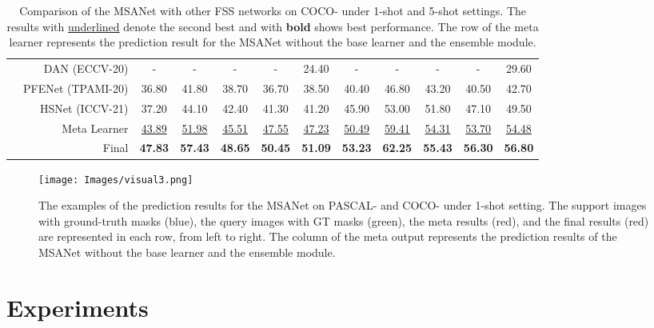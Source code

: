 \documentclass[10pt,twocolumn,letterpaper]{article}
\begin{document}
\begin{table*}[h]
\begin{adjustbox}{width=0.8\textwidth}
\begin{tabular}{l r| c c c c c | c c c c c }
& DAN (ECCV-20) \cite{FSS11} & - & - & - & - & 24.40 & - & - & - & - &29.60 \\
& PFENet (TPAMI-20) \cite{FSS2PFE} & 36.80 & 41.80 & 38.70 & 36.70 & 38.50 & 40.40 & 46.80 & 43.20 & 40.50 & 42.70 \\
& HSNet (ICCV-21) \cite{FSS9Hsnet} & 37.20 & 44.10 & 42.40 & 41.30 & 41.20 & 45.90 & 53.00 & 51.80 & 47.10 & 49.50\\
\cline{2-12}
&Meta Learner & \underline{43.89} & \underline{51.98} & \underline{45.51} & \underline{47.55} & \underline{47.23} & \underline{50.49} & \underline{59.41} & \underline{54.31} & \underline{53.70} & \underline{54.48}\\
\rowcolor{lightgray}
\cellcolor[HTML]{FFFFFF} & Final & \textbf{47.83} & \textbf{57.43} & \textbf{48.65} & \textbf{50.45}& \textbf{51.09} & \textbf{53.23} & \textbf{62.25} & \textbf{55.43} & \textbf{56.30} & \textbf{56.80}\\\midrule\end{tabular}
\end{adjustbox}
\caption{\label{cocotable}Comparison of the MSANet with other FSS networks on COCO- under 1-shot and 5-shot settings. The results with \underline{underlined} denote the second best and with \textbf{bold} shows best performance. The row of the meta learner represents the prediction result for the MSANet without the base learner and the ensemble module.}
\end{table*}

\begin{figure*}[t]
\centering
\texttt{[image: Images/visual3.png]}
\caption{The examples of the prediction results for the MSANet on PASCAL- and COCO- under 1-shot setting. The support images with ground-truth masks (blue), the query images with GT masks (green), the meta results (red), and the final results (red) are represented in each row, from left to right. The column of the meta output represents the prediction results of the MSANet without the base learner and the ensemble module.}
\label{fig:visual}
\end{figure*}
\section{Experiments}
\end{document}

